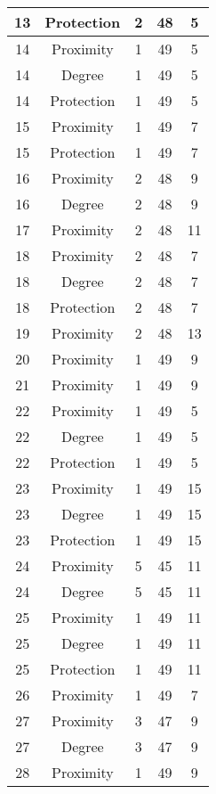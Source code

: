 \documentclass[results.tex]{subfiles}
\begin{document}
\begin{center}
\begin{tabular}{| c || c | c | c | c |}
    \hline
    13 & Protection & 2 & 48 & 5 \\ 
    \hline
    14 & Proximity & 1 & 49 & 5 \\ 
    \hline
    14 & Degree & 1 & 49 & 5 \\ 
    \hline
    14 & Protection & 1 & 49 & 5 \\ 
    \hline
    15 & Proximity & 1 & 49 & 7 \\ 
    \hline
    15 & Protection & 1 & 49 & 7 \\ 
    \hline
    16 & Proximity & 2 & 48 & 9 \\ 
    \hline
    16 & Degree & 2 & 48 & 9 \\ 
    \hline
    17 & Proximity & 2 & 48 & 11 \\ 
    \hline
    18 & Proximity & 2 & 48 & 7 \\ 
    \hline
    18 & Degree & 2 & 48 & 7 \\ 
    \hline
    18 & Protection & 2 & 48 & 7 \\ 
    \hline
    19 & Proximity & 2 & 48 & 13 \\ 
    \hline
    20 & Proximity & 1 & 49 & 9 \\ 
    \hline
    21 & Proximity & 1 & 49 & 9 \\ 
    \hline
    22 & Proximity & 1 & 49 & 5 \\ 
    \hline
    22 & Degree & 1 & 49 & 5 \\ 
    \hline
    22 & Protection & 1 & 49 & 5 \\ 
    \hline
    23 & Proximity & 1 & 49 & 15 \\ 
    \hline
    23 & Degree & 1 & 49 & 15 \\ 
    \hline
    23 & Protection & 1 & 49 & 15 \\ 
    \hline
    24 & Proximity & 5 & 45 & 11 \\ 
    \hline
    24 & Degree & 5 & 45 & 11 \\ 
    \hline
    25 & Proximity & 1 & 49 & 11 \\ 
    \hline
    25 & Degree & 1 & 49 & 11 \\ 
    \hline
    25 & Protection & 1 & 49 & 11 \\ 
    \hline
    26 & Proximity & 1 & 49 & 7 \\ 
    \hline
    27 & Proximity & 3 & 47 & 9 \\ 
    \hline
    27 & Degree & 3 & 47 & 9 \\ 
    \hline
    28 & Proximity & 1 & 49 & 9 \\ 

\end{tabular}
\end{center}
\end{document}
